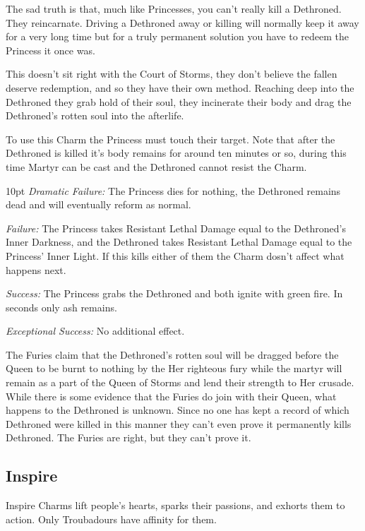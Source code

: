 The sad truth is that, much like Princesses, you can't really kill a Dethroned. They reincarnate. Driving a Dethroned away or killing will normally keep it away for a very long time but for a truly permanent solution you have to redeem the Princess it once was. 

This doesn’t sit right with the Court of Storms, they don't believe the fallen deserve redemption, and so they have their own method. Reaching deep into the Dethroned they grab hold of their soul, they incinerate their body and drag the Dethroned's rotten soul into the afterlife.

To use this Charm the Princess must touch their target. Note that after the Dethroned is killed it's body remains for around ten minutes or so, during this time Martyr can be cast and the Dethroned cannot resist the Charm. 

\begin{myindentpar}{10pt} \emph{Dramatic Failure:} The Princess dies for nothing, the Dethroned remains dead and will eventually reform as normal. 

    \emph{Failure:} The Princess takes Resistant Lethal Damage equal to the Dethroned's Inner Darkness, and the Dethroned takes Resistant Lethal Damage equal to the Princess' Inner Light. If this kills either of them the Charm dosn't affect what happens next. 

    \emph{Success:} The Princess grabs the Dethroned and both ignite with green fire. In seconds only ash remains. 

    \emph{Exceptional Success:} No additional effect.\end{myindentpar} 

The Furies claim that the Dethroned's rotten soul will be dragged before the Queen to be burnt to nothing by the Her righteous fury while the martyr will remain as a part of the Queen of Storms and lend their strength to Her crusade. While there is some evidence that the Furies do join with their Queen, what happens to the Dethroned is unknown. Since no one has kept a record of which Dethroned were killed in this manner they can't even prove it permanently kills Dethroned. The Furies are right, but they can't prove it. 

\subsection*{Inspire}
\label{subsec:Inspire}
Inspire Charms lift people's hearts, sparks their passions, and exhorts them to action. Only Troubadours have affinity for them.


